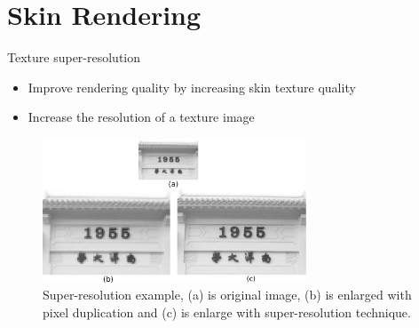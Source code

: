 \documentclass{beamer}
\begin{document}
\section{Skin Rendering}


\begin{frame}{Texture super-resolution}

\begin{itemize}
\setlength\itemsep{0.5em}
\item Improve rendering quality by increasing skin texture quality
\item Increase the resolution of a texture image
\end{itemize}

\begin{figure}
        \centering
        \includegraphics[width=0.7\textwidth]{img/super-resolution-int}
        \caption{Super-resolution example, (a) is original image, (b) is enlarged with pixel duplication and (c) is enlarge with super-resolution technique.}
\end{figure}
\end{frame}

\end{document}
